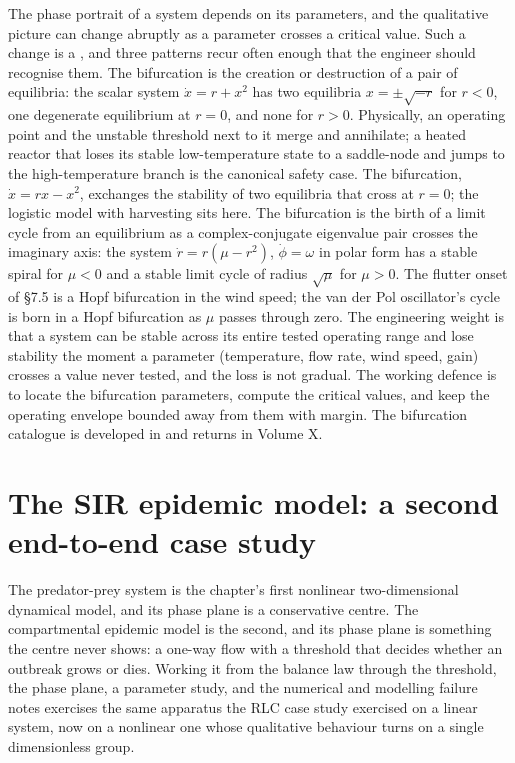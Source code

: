 \begin{mastery}
The phase portrait of a system depends on its parameters, and the
qualitative picture can change abruptly as a parameter crosses a
critical value. Such a change is a , and three
patterns recur often enough that the engineer should recognise them.
The  bifurcation is the creation or destruction
of a pair of equilibria: the scalar system $\dot{x} = r + x^{2}$ has
two equilibria $x = \pm\sqrt{-r}$ for $r < 0$, one degenerate
equilibrium at $r = 0$, and none for $r > 0$. Physically, an
operating point and the unstable threshold next to it merge and
annihilate; a heated reactor that loses its stable low-temperature
state to a saddle-node and jumps to the high-temperature branch is
the canonical safety case. The  bifurcation,
$\dot{x} = r x - x^{2}$, exchanges the stability of two equilibria
that cross at $r = 0$; the logistic model with harvesting sits here.
The  bifurcation is the birth of a limit cycle from an
equilibrium as a complex-conjugate eigenvalue pair crosses the
imaginary axis: the system $\dot{r} = r(\mu - r^{2})$, $\dot{\phi} =
\omega$ in polar form has a stable spiral for $\mu < 0$ and a stable
limit cycle of radius $\sqrt{\mu}$ for $\mu > 0$. The flutter onset
of \S7.5 is a Hopf bifurcation in the wind speed; the van der Pol
oscillator's cycle is born in a Hopf bifurcation as $\mu$ passes
through zero. The engineering weight is that a system can be stable
across its entire tested operating range and lose stability the
moment a parameter (temperature, flow rate, wind speed, gain)
crosses a value never tested, and the loss is not gradual. The
working defence is to locate the bifurcation parameters, compute the
critical values, and keep the operating envelope bounded away from
them with margin. The bifurcation catalogue is developed in
\textcite{text:v2ch07-strogatz-nonlinear} and returns in Volume X.
\end{mastery}

\section{The SIR epidemic model: a second end-to-end case study}

The predator-prey system is the chapter's first nonlinear
two-dimensional dynamical model, and its phase plane is a conservative
centre. The compartmental epidemic model is the second, and its phase
plane is something the centre never shows: a one-way flow with a
threshold that decides whether an outbreak grows or dies. Working it
from the balance law through the threshold, the phase plane, a
parameter study, and the numerical and modelling failure notes
exercises the same apparatus the RLC case study exercised on a linear
system, now on a nonlinear one whose qualitative behaviour turns on a
single dimensionless group.

